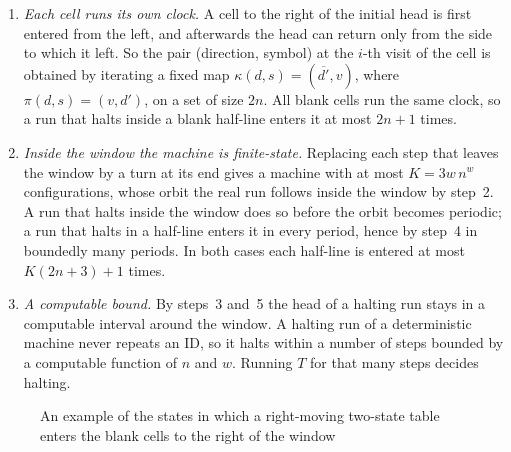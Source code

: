 \documentclass{article}
\theoremstyle{definition}
\theoremstyle{remark}
\begin{document}
\begin{enumerate}
So the numbers of entries into $[k,\infty)$, $[k+1,\infty)$, $[k+2,\infty)$, \dots\ strictly decrease, and the head never passes $k$ plus the number of entries into $[k,\infty)$.
\item \emph{Each cell runs its own clock.}
A cell to the right of the initial head is first entered from the left, and afterwards the head can return only from the side to which it left.
So the pair (direction, symbol) at the $i$-th visit of the cell is obtained by iterating a fixed map $\kappa(d,s)=(\overline{d'},v)$, where $\pi(d,s)=(v,d')$, on a set of size $2n$.
All blank cells run the same clock, so a run that halts inside a blank half-line enters it at most $2n+1$ times.
\item \emph{Inside the window the machine is finite-state.}
Replacing each step that leaves the window by a turn at its end gives a machine with at most $K=3w\,n^{w}$ configurations, whose orbit the real run follows inside the window by step~2.
A run that halts inside the window does so before the orbit becomes periodic; a run that halts in a half-line enters it in every period, hence by step~4 in boundedly many periods.
In both cases each half-line is entered at most $K(2n+3)+1$ times.
\item \emph{A computable bound.}
By steps~3 and~5 the head of a halting run stays in a computable interval around the window.
A halting run of a deterministic machine never repeats an ID, so it halts within a number of steps bounded by a computable function of $n$ and $w$.
Running $T$ for that many steps decides halting.
\end{enumerate}
\begin{figure}[tb]
\centering
{}
\caption{An example of the states in which a right-moving two-state table enters the blank cells to the right of the window}
\label{fig:oneway}
\end{figure}
\end{document}
